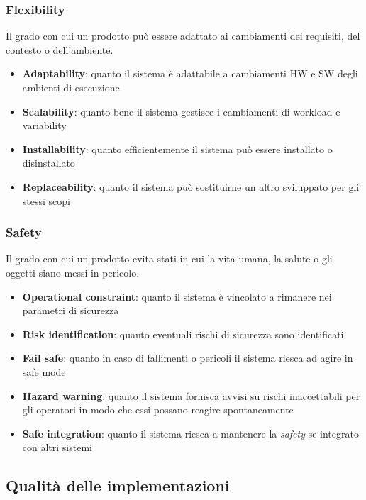 \subsubsection{Flexibility}
Il grado con cui un prodotto può essere adattato ai cambiamenti dei requisiti, del contesto o dell'ambiente.
\begin{itemize}
	\item \textbf{Adaptability}: quanto il sistema è adattabile a cambiamenti HW e SW degli ambienti di esecuzione
	\item \textbf{Scalability}: quanto bene il sistema gestisce i cambiamenti di workload e variability
	\item \textbf{Installability}: quanto efficientemente il sistema può essere installato o disinstallato
	\item \textbf{Replaceability}: quanto il sistema può sostituirne un altro sviluppato per gli stessi scopi
\end{itemize}

\subsubsection{Safety}
Il grado con cui un prodotto evita stati in cui la vita umana, la salute o gli oggetti siano messi in pericolo.
\begin{itemize}
	\item \textbf{Operational constraint}: quanto il sistema è vincolato a rimanere nei parametri di sicurezza
	\item \textbf{Risk identification}: quanto eventuali rischi di sicurezza sono identificati
	\item \textbf{Fail safe}: quanto in caso di fallimenti o pericoli il sistema riesca ad agire in safe mode
	\item \textbf{Hazard warning}: quanto il sistema fornisca avvisi su rischi inaccettabili per gli operatori in modo che essi possano reagire spontaneamente
	\item \textbf{Safe integration}: quanto il sistema riesca a mantenere la \textit{safety} se integrato con altri sistemi
\end{itemize}

\newpage
\subsection{Qualità delle implementazioni}
